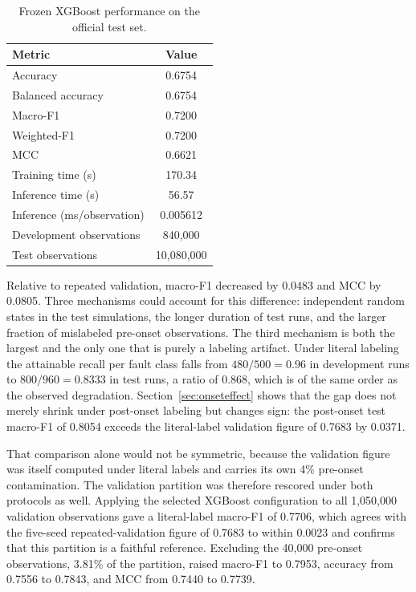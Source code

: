 \documentclass[10pt,twocolumn,a4paper]{article}
\begin{document}
\begin{table}[H]
\centering
\caption{Frozen XGBoost performance on the official test set.}
\label{tab:test}
\small
\begin{tabular}{lc}
\toprule
Metric & Value\\
\midrule
Accuracy & 0.6754\\
Balanced accuracy & 0.6754\\
Macro-F1 & 0.7200\\
Weighted-F1 & 0.7200\\
MCC & 0.6621\\
Training time (s) & 170.34\\
Inference time (s) & 56.57\\
Inference (ms/observation) & 0.005612\\
Development observations & 840,000\\
Test observations & 10,080,000\\
\bottomrule
\end{tabular}
\end{table}

Relative to repeated validation, macro-F1 decreased by 0.0483 and MCC by
0.0805. Three mechanisms could account for this difference: independent random
states in the test simulations, the longer duration of test runs, and the
larger fraction of mislabeled pre-onset observations. The third mechanism is
both the largest and the only one that is purely a labeling artifact. Under
literal labeling the attainable recall per fault class falls from $480/500=0.96$
in development runs to $800/960=0.8333$ in test runs, a ratio of 0.868, which
is of the same order as the observed degradation. Section~\ref{sec:onseteffect}
shows that the gap does not merely shrink under post-onset labeling but changes
sign: the post-onset test macro-F1 of 0.8054 exceeds the literal-label
validation figure of 0.7683 by 0.0371.

That comparison alone would not be symmetric, because the validation figure
was itself computed under literal labels and carries its own 4\% pre-onset
contamination. The validation partition was therefore rescored under both
protocols as well. Applying the selected XGBoost configuration to all
1,050,000 validation observations gave a literal-label macro-F1 of 0.7706,
which agrees with the five-seed repeated-validation figure of 0.7683 to within
0.0023 and confirms that this partition is a faithful reference. Excluding the
40,000 pre-onset observations, 3.81\% of the partition, raised macro-F1 to
0.7953, accuracy from 0.7556 to 0.7843, and MCC from 0.7440 to 0.7739.
\end{document}
